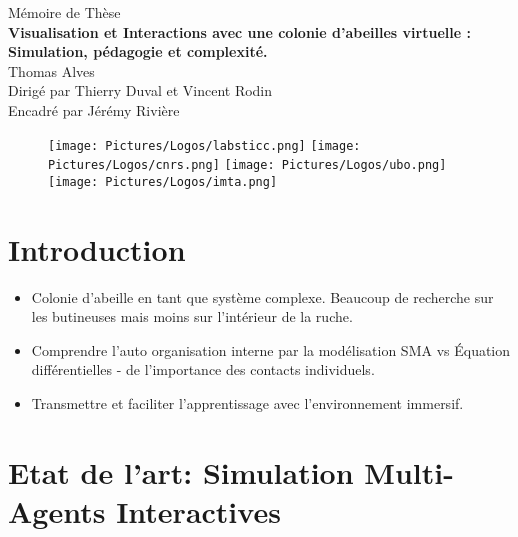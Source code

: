 \documentclass[11pt,a4paper]{article}
\begin{document}
	\begin{titlepage}
		\begin{center}
		\Large Mémoire de Thèse\\
		\vspace{4em}
		\LARGE\textbf{Visualisation et Interactions avec une colonie d'abeilles virtuelle :\\}
		\vspace{1em}
		\Large\textbf{Simulation, pédagogie et complexité.\\}		
		\vspace{8em}
		\LARGE Thomas Alves\\
		\vspace{8em}
		\Large Dirigé par Thierry Duval et Vincent Rodin\\
		Encadré par Jérémy Rivière\\
		\vspace{7em}
		\begin{figure}[!h]
		\centering
		\texttt{[image: Pictures/Logos/labsticc.png]}
		\hspace{0.4cm}
		\texttt{[image: Pictures/Logos/cnrs.png]}
		\hspace{0.4cm}
		\texttt{[image: Pictures/Logos/ubo.png]}
		\hspace{0.4cm}
		\texttt{[image: Pictures/Logos/imta.png]}
		\end{figure}
		\end{center}	 
	\end{titlepage}
	
\tableofcontents
	
\section{Introduction}
\begin{itemize}
	\item Colonie d'abeille en tant que système complexe. Beaucoup de recherche sur les butineuses mais moins sur l'intérieur de la ruche.	
	\item Comprendre l'auto organisation interne par la modélisation SMA vs Équation différentielles - de l'importance des contacts individuels.	
	\item Transmettre et faciliter l'apprentissage avec l'environnement immersif.
\end{itemize}
\section{Etat de l'art: Simulation Multi-Agents Interactives}
\end{document}
